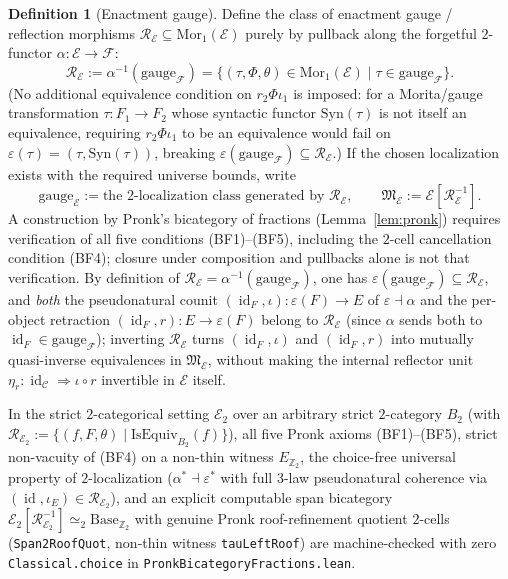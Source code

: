 \documentclass[11pt]{article}
\theoremstyle{plain}
\theoremstyle{definition}
\newtheorem{definition}[theorem]{Definition}
\newcommand{\cF}{\mathcal{F}}
\newcommand{\cC}{\mathcal{C}}
\newcommand{\fM}{\mathfrak{M}}
\newcommand{\Mor}{\mathrm{Mor}}
\newcommand{\Syn}{\mathrm{Syn}}
\newcommand{\cE}{\mathcal{E}}
\DeclareMathOperator{\id}{id}
\begin{document}
\begin{definition}[Enactment gauge]\label{def:gauge-E}
Define the class of enactment gauge / reflection morphisms $\mathcal{R}_\cE \subseteq \Mor_1(\cE)$ purely by pullback along the forgetful $2$-functor $\alpha : \cE \to \cF$:
\[
  \mathcal{R}_\cE := \alpha^{-1}(\mathrm{gauge}_\cF) = \bigl\{ (\tau, \Phi, \theta) \in \Mor_1(\cE) \;\big|\; \tau \in \mathrm{gauge}_\cF \bigr\}.
\]
(No additional equivalence condition on $r_2 \Phi \iota_1$ is imposed: for a Morita/gauge transformation $\tau : F_1 \to F_2$ whose syntactic functor $\Syn(\tau)$ is not itself an equivalence, requiring $r_2 \Phi \iota_1$ to be an equivalence would fail on $\varepsilon(\tau) = (\tau, \Syn(\tau))$, breaking $\varepsilon(\mathrm{gauge}_\cF) \subseteq \mathcal{R}_\cE$.) If the chosen localization exists with the required universe bounds, write
\[ \mathrm{gauge}_\cE := \text{the $2$-localization class generated by } \mathcal{R}_\cE, \qquad \fM_\cE := \cE[\mathcal{R}_\cE^{-1}]. \]
A construction by Pronk's bicategory of fractions (Lemma~\ref{lem:pronk}) requires verification of all five conditions (BF1)--(BF5), including the $2$-cell cancellation condition (BF4); closure under composition and pullbacks alone is not that verification. By definition of $\mathcal{R}_\cE = \alpha^{-1}(\mathrm{gauge}_\cF)$, one has $\varepsilon(\mathrm{gauge}_\cF) \subseteq \mathcal{R}_\cE$, and \emph{both} the pseudonatural counit $(\id_F, \iota) : \varepsilon(F) \to E$ of $\varepsilon \dashv \alpha$ and the per-object retraction $(\id_F, r) : E \to \varepsilon(F)$ belong to $\mathcal{R}_\cE$ (since $\alpha$ sends both to $\id_F \in \mathrm{gauge}_\cF$); inverting $\mathcal{R}_\cE$ turns $(\id_F, \iota)$ and $(\id_F, r)$ into mutually quasi-inverse equivalences in $\fM_\cE$, without making the internal reflector unit $\eta_r : \id_\cC \Rightarrow \iota \circ r$ invertible in $\cE$ itself.

In the strict $2$-categorical setting $\cE_2$ over an arbitrary strict $2$-category $B_2$ (with $\mathcal{R}_{\cE_2} := \{(f, F, \theta) \mid \mathrm{IsEquiv}_{B_2}(f)\}$), all five Pronk axioms (BF1)--(BF5), strict non-vacuity of (BF4) on a non-thin witness $E_{\mathbb{Z}_2}$, the choice-free universal property of $2$-localization ($\alpha^* \dashv \varepsilon^*$ with full $3$-law pseudonatural coherence via $(\id, \iota_E) \in \mathcal{R}_{\cE_2}$), and an explicit computable span bicategory $\cE_2[\mathcal{R}_{\cE_2}^{-1}] \simeq_2 \mathrm{Base}_{\mathbb{Z}_2}$ with genuine Pronk roof-refinement quotient $2$-cells (\texttt{Span2RoofQuot}, non-thin witness \texttt{tauLeftRoof}) are machine-checked with zero \texttt{Classical.choice} in \texttt{PronkBicategoryFractions.lean}.
\end{definition}
\end{document}
